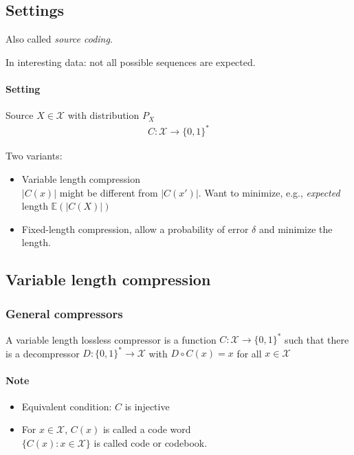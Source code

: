 \subsection{Settings}
Also called \emph{source coding}.

In interesting data: not all possible sequences are expected.

\paragraph{Setting} Source $X\in \mathcal{X}$ with distribution $P_X$
\begin{align*}
C:\mathcal{X}\to \{0,1\}^*
\end{align*}

Two variants:
\begin{itemize}
\item Variable length compression\\
$|C(x)|$ might be different from $|C(x')|$.
Want to minimize, e.g., \emph{expected} length $\mathbb{E}(|C(X)|)$
\item Fixed-length compression, allow a probability of error $\delta$ and minimize the length.
\end{itemize}

\subsection{Variable length compression}
\subsubsection{General compressors}

\begin{defi}
A variable length lossless compressor  is a function $C:\mathcal{X}\to \{0,1\}^*$ such that there is a decompressor $D: \{0,1\}^* \to \mathcal{X}$ with $D\circ C(x)=x$ for all $x\in \mathcal{X}$
\end{defi}

\paragraph{Note}
\begin{itemize}
\item Equivalent condition: $C$ is injective
\item For $x\in \mathcal{X}$, $C(x)$ is called a code word
\\$\{C(x):x\in \mathcal{X}\}$ is called code or codebook.
\end{itemize}

